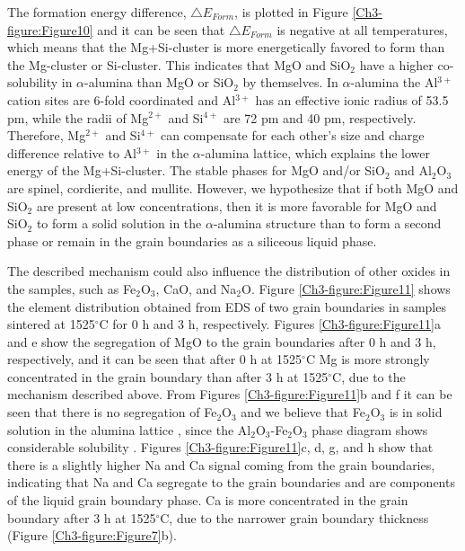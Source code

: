 \noindent The formation energy difference, $\bigtriangleup E_{Form}$, is plotted in Figure \ref{Ch3-figure:Figure10} and it can be seen that $\bigtriangleup E_{Form}$ is negative at all temperatures, which means that the Mg+Si-cluster is more energetically favored to form than the Mg-cluster or Si-cluster. This indicates that MgO and SiO$_{2}$ have a higher co-solubility in $\alpha$-alumina than MgO or SiO$_{2}$ by themselves. In $\alpha$-alumina the Al$^{3+}$ cation sites are 6-fold coordinated and Al$^{3+}$ has an effective ionic radius of 53.5 pm, while the radii of Mg$^{2+}$ and Si$^{4+}$ are 72 pm and 40 pm, respectively. Therefore, Mg$^{2+}$ and Si$^{4+}$ can compensate for each other's size and charge difference relative to Al$^{3+}$ in the $\alpha$-alumina lattice, which explains the lower energy of the Mg+Si-cluster. The stable phases for MgO and/or SiO$_{2}$ and Al$_{2}$O$_{3}$ are spinel, cordierite, and mullite. However, we hypothesize that if both MgO and SiO$_{2}$ are present at low concentrations, then it is more favorable for MgO and SiO$_{2}$ to form a solid solution in the $\alpha$-alumina structure than to form a second phase or remain in the grain boundaries as a siliceous liquid phase. 

The described mechanism could also influence the distribution of other oxides in the samples, such as Fe$_{2}$O$_{3}$, CaO, and Na$_{2}$O. Figure \ref{Ch3-figure:Figure11} shows the element distribution obtained from EDS of two grain boundaries in samples sintered at 1525$^{\circ}$C for 0 h and 3 h, respectively. Figures \ref{Ch3-figure:Figure11}a and e show the segregation of MgO to the grain boundaries after 0 h and 3 h, respectively, and it can be seen that after 0 h at 1525$^{\circ}$C Mg is more strongly concentrated in the grain boundary than after 3 h at 1525$^{\circ}$C, due to the mechanism described above. From Figures \ref{Ch3-figure:Figure11}b and f it can be seen that there is no segregation of Fe$_{2}$O$_{3}$ and we believe that Fe$_{2}$O$_{3}$ is in solid solution in the alumina lattice \cite{Atkinson2003}, since the Al$_{2}$O$_{3}$-Fe$_{2}$O$_{3}$ phase diagram shows considerable solubility \cite{Raghavan2010}. Figures \ref{Ch3-figure:Figure11}c, d, g, and h show that there is a slightly higher Na and Ca signal coming from the grain boundaries, indicating that Na and Ca segregate to the grain boundaries and are components of the liquid grain boundary phase. Ca is more concentrated in the grain boundary after 3 h at 1525$^{\circ}$C, due to the narrower grain boundary thickness (Figure \ref{Ch3-figure:Figure7}b). 

